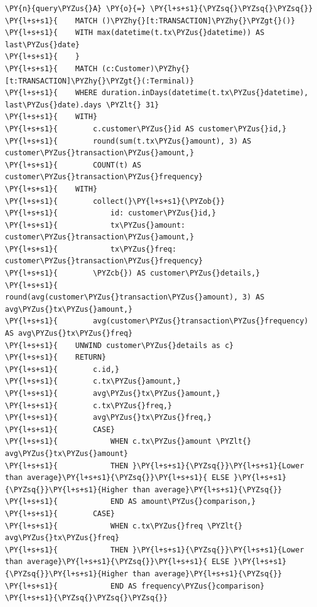     \begin{tcolorbox}[breakable, size=fbox, boxrule=1pt, pad at break*=1mm,colback=cellbackground, colframe=cellborder]
\begin{Verbatim}[commandchars=\\\{\}]
\PY{n}{query\PYZus{}A} \PY{o}{=} \PY{l+s+s1}{\PYZsq{}\PYZsq{}\PYZsq{}}
\PY{l+s+s1}{    MATCH ()\PYZhy{}[t:TRANSACTION]\PYZhy{}\PYZgt{}()}
\PY{l+s+s1}{    WITH max(datetime(t.tx\PYZus{}datetime)) AS last\PYZus{}date}
\PY{l+s+s1}{    }
\PY{l+s+s1}{    MATCH (c:Customer)\PYZhy{}[t:TRANSACTION]\PYZhy{}\PYZgt{}(:Terminal)}
\PY{l+s+s1}{    WHERE duration.inDays(datetime(t.tx\PYZus{}datetime), last\PYZus{}date).days \PYZlt{} 31}
\PY{l+s+s1}{    WITH}
\PY{l+s+s1}{        c.customer\PYZus{}id AS customer\PYZus{}id,}
\PY{l+s+s1}{        round(sum(t.tx\PYZus{}amount), 3) AS customer\PYZus{}transaction\PYZus{}amount,}
\PY{l+s+s1}{        COUNT(t) AS customer\PYZus{}transaction\PYZus{}frequency}
\PY{l+s+s1}{    WITH}
\PY{l+s+s1}{        collect(}\PY{l+s+s1}{\PYZob{}}
\PY{l+s+s1}{            id: customer\PYZus{}id,}
\PY{l+s+s1}{            tx\PYZus{}amount: customer\PYZus{}transaction\PYZus{}amount,}
\PY{l+s+s1}{            tx\PYZus{}freq: customer\PYZus{}transaction\PYZus{}frequency}
\PY{l+s+s1}{        \PYZcb{}) AS customer\PYZus{}details,}
\PY{l+s+s1}{        round(avg(customer\PYZus{}transaction\PYZus{}amount), 3) AS avg\PYZus{}tx\PYZus{}amount,}
\PY{l+s+s1}{        avg(customer\PYZus{}transaction\PYZus{}frequency) AS avg\PYZus{}tx\PYZus{}freq}
\PY{l+s+s1}{    UNWIND customer\PYZus{}details as c}
\PY{l+s+s1}{    RETURN}
\PY{l+s+s1}{        c.id,}
\PY{l+s+s1}{        c.tx\PYZus{}amount,}
\PY{l+s+s1}{        avg\PYZus{}tx\PYZus{}amount,}
\PY{l+s+s1}{        c.tx\PYZus{}freq,}
\PY{l+s+s1}{        avg\PYZus{}tx\PYZus{}freq,}
\PY{l+s+s1}{        CASE}
\PY{l+s+s1}{            WHEN c.tx\PYZus{}amount \PYZlt{} avg\PYZus{}tx\PYZus{}amount}
\PY{l+s+s1}{            THEN }\PY{l+s+s1}{\PYZsq{}}\PY{l+s+s1}{Lower than average}\PY{l+s+s1}{\PYZsq{}}\PY{l+s+s1}{ ELSE }\PY{l+s+s1}{\PYZsq{}}\PY{l+s+s1}{Higher than average}\PY{l+s+s1}{\PYZsq{}}
\PY{l+s+s1}{            END AS amount\PYZus{}comparison,}
\PY{l+s+s1}{        CASE}
\PY{l+s+s1}{            WHEN c.tx\PYZus{}freq \PYZlt{} avg\PYZus{}tx\PYZus{}freq}
\PY{l+s+s1}{            THEN }\PY{l+s+s1}{\PYZsq{}}\PY{l+s+s1}{Lower than average}\PY{l+s+s1}{\PYZsq{}}\PY{l+s+s1}{ ELSE }\PY{l+s+s1}{\PYZsq{}}\PY{l+s+s1}{Higher than average}\PY{l+s+s1}{\PYZsq{}}
\PY{l+s+s1}{            END AS frequency\PYZus{}comparison}
\PY{l+s+s1}{\PYZsq{}\PYZsq{}\PYZsq{}}
\end{Verbatim}
\end{tcolorbox}

